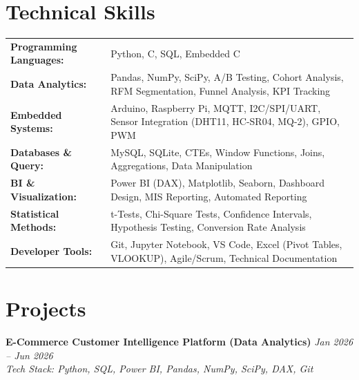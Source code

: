 \documentclass[11pt,a4paper]{article}
\newcommand{\projectheading}[3]{%
  \noindent\textbf{#1} \hfill \textit{#2} \\
  \noindent\textit{Tech Stack: #3} \\[2pt]
}
\newcommand{\skillrow}[2]{%
  \noindent\textbf{#1:} & #2 \\[2pt]
}
\begin{document}
\section{Technical Skills}

\begin{tabularx}{\textwidth}{@{}lX@{}}
\skillrow{Programming Languages}{Python, C, SQL, Embedded C}
\skillrow{Data Analytics}{Pandas, NumPy, SciPy, A/B Testing, Cohort Analysis, RFM Segmentation, Funnel Analysis, KPI Tracking}
\skillrow{Embedded Systems}{Arduino, Raspberry Pi, MQTT, I2C/SPI/UART, Sensor Integration (DHT11, HC-SR04, MQ-2), GPIO, PWM}
\skillrow{Databases \& Query}{MySQL, SQLite, CTEs, Window Functions, Joins, Aggregations, Data Manipulation}
\skillrow{BI \& Visualization}{Power BI (DAX), Matplotlib, Seaborn, Dashboard Design, MIS Reporting, Automated Reporting}
\skillrow{Statistical Methods}{t-Tests, Chi-Square Tests, Confidence Intervals, Hypothesis Testing, Conversion Rate Analysis}
\skillrow{Developer Tools}{Git, Jupyter Notebook, VS Code, Excel (Pivot Tables, VLOOKUP), Agile/Scrum, Technical Documentation}
\end{tabularx}

\section{Projects}

\projectheading
  {E-Commerce Customer Intelligence Platform (Data Analytics)}
  {Jan 2026 -- Jun 2026}
  {Python, SQL, Power BI, Pandas, NumPy, SciPy, DAX, Git}
\end{document}
